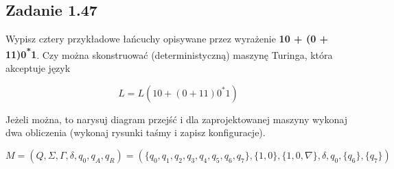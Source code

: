 \documentclass[leqno]{article}
\begin{document}
        \subsection{Zadanie 1.47}

            Wypisz cztery przykładowe łańcuchy opisywane przez wyrażenie
            \textbf{10 + (0 + 11)0\textsuperscript{*}1}. Czy można skonstruować 
            (deterministyczną) maszynę Turinga, która akceptuje język

            \begin{equation}
                L = L(10+(0+11)0^*1)
            \end{equation}

            Jeżeli można, to narysuj diagram przejść i dla zaprojektowanej 
            maszyny wykonaj dwa obliczenia (wykonaj rysunki taśmy i zapisz konfiguracje).

            \begin{equation}
                M = (Q, \Sigma, \Gamma, \delta, q_0, q_A, q_R) = (
                    \{q_0, q_1, q_2, q_3, q_4, q_5, q_6, q_7\}, 
                    \{1, 0\}, 
                    \{1, 0, \nabla\}, 
                    \delta, 
                    q_0, 
                    \{q_6\}, 
                    \{q_7\}
                )
            \end{equation}
\end{document}
